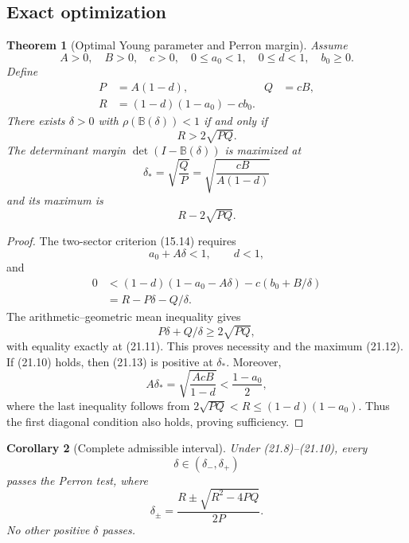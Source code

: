 \documentclass[11pt]{article}
\newtheorem{theorem}{Theorem}[section]
\newtheorem{corollary}[theorem]{Corollary}
\theoremstyle{remark}
\begin{document}
\subsection{Exact optimization}

\begin{theorem}[Optimal Young parameter and Perron margin]
\label{thm:v17v21-optimal}
Assume
\[
 A>0,\quad B>0,\quad c>0,\quad
 0\leq a_0<1,\quad0\leq d<1,\quad b_0\geq0.        \tag{21.8}
\]
Define
\[
\begin{aligned}
 P&=A(1-d),&
 Q&=cB,\\
 R&=(1-d)(1-a_0)-cb_0.                             \tag{21.9}
\end{aligned}
\]
There exists \(\delta>0\) with
\(\rho({\mathbb B}(\delta))<1\) if and only if
\[
\boxed{R>2\sqrt{PQ}.}                              \tag{21.10}
\]
The determinant margin
\(\det(I-{\mathbb B}(\delta))\) is maximized at
\[
\boxed{\delta_*=\sqrt{\frac{Q}{P}}
=\sqrt{\frac{cB}{A(1-d)}}}                         \tag{21.11}
\]
and its maximum is
\[
\boxed{R-2\sqrt{PQ}.}                              \tag{21.12}
\]
\end{theorem}

\begin{proof}
The two-sector criterion (15.14) requires
\[
 a_0+A\delta<1,\qquad d<1,
\]
and
\[
\begin{aligned}
 0&<
 (1-d)(1-a_0-A\delta)
 -c(b_0+B/\delta)\\
 &=R-P\delta-Q/\delta.                             \tag{21.13}
\end{aligned}
\]
The arithmetic--geometric mean inequality gives
\[
 P\delta+Q/\delta\geq2\sqrt{PQ},
\]
with equality exactly at (21.11).  This proves necessity and the
maximum (21.12).  If (21.10) holds, then (21.13) is positive at
\(\delta_*\).  Moreover,
\[
 A\delta_*
 =\sqrt{\frac{AcB}{1-d}}
 <\frac{1-a_0}{2},
\]
where the last inequality follows from
\(2\sqrt{PQ}<R\leq(1-d)(1-a_0)\).  Thus the first diagonal
condition also holds, proving sufficiency.
\end{proof}

\begin{corollary}[Complete admissible interval]
\label{cor:v17v21-interval}
Under (21.8)--(21.10), every
\[
 \delta\in(\delta_-,\delta_+)                      \tag{21.14}
\]
passes the Perron test, where
\[
 \delta_\pm
 =\frac{R\pm\sqrt{R^2-4PQ}}{2P}.                  \tag{21.15}
\]
No other positive \(\delta\) passes.
\end{corollary}
\end{document}
